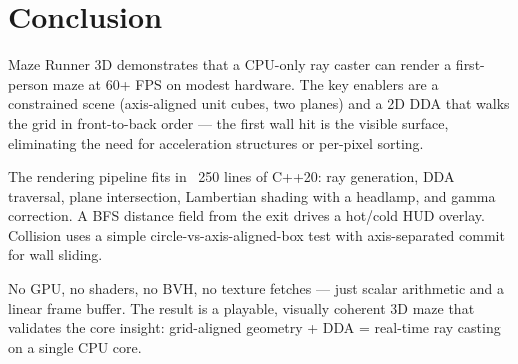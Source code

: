 \chapter{Conclusion}

Maze Runner 3D demonstrates that a CPU-only ray caster can render a first-person maze at 60+ FPS on modest hardware. The key enablers are a constrained scene (axis-aligned unit cubes, two planes) and a 2D DDA that walks the grid in front-to-back order — the first wall hit is the visible surface, eliminating the need for acceleration structures or per-pixel sorting.

The rendering pipeline fits in ~250 lines of C++20: ray generation, DDA traversal, plane intersection, Lambertian shading with a headlamp, and gamma correction. A BFS distance field from the exit drives a hot/cold HUD overlay. Collision uses a simple circle-vs-axis-aligned-box test with axis-separated commit for wall sliding.

No GPU, no shaders, no BVH, no texture fetches — just scalar arithmetic and a linear frame buffer. The result is a playable, visually coherent 3D maze that validates the core insight: grid-aligned geometry + DDA = real-time ray casting on a single CPU core.